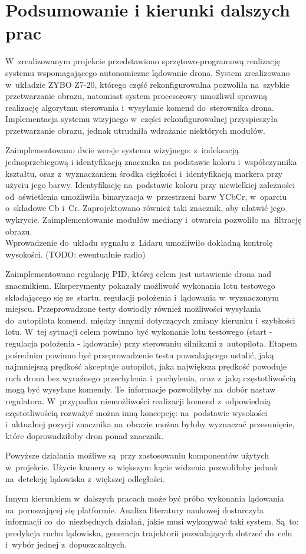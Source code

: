 \chapter{Podsumowanie i kierunki dalszych prac}
\label{cha:Podsumowanie i kierunki dalszych prac}
W~zrealizowanym projekcie przedstawiono sprzętowo-programową realizację systemu wspomagającego autonomiczne lądowanie drona. System zrealizowano w~układzie ZYBO Z7-20, którego część rekonfigurowalna pozwoliła na~szybkie przetwarzanie obrazu, natomiast system procesorowy umożliwił sprawną realizację algorytmu sterowania i~wysyłanie komend do~sterownika drona. Implementacja systemu wizyjnego w~części rekonfigurowalnej przyspieszyła przetwarzanie obrazu, jednak utrudniła wdrażanie niektórych modułów.\par
Zaimplementowano dwie wersje systemu wizyjnego: z~indeksacją jednoprzebiegową i identyfikacją znacznika na podstawie koloru i~współczynnika kształtu, oraz z~wyznaczaniem środka ciężkości i~identyfikacją markera przy użyciu jego barwy. Identyfikację na~podstawie koloru przy niewielkiej zależności od~oświetlenia umożliwiła binaryzacja w~przestrzeni barw YCbCr, w~oparciu o~składowe Cb i~Cr. Zaprojektowano również taki znacznik, aby ułatwić jego wykrycie. Zaimplementowanie modułów mediany i~otwarcia pozwoliło na~filtrację obrazu.\\
Wprowadzenie do~układu sygnału z~Lidaru umożliwiło dokładną kontrolę wysokości. (TODO: ewentualnie radio)\par
Zaimplementowano regulację PID, której celem jest ustawienie drona nad znacznikiem. Eksperymenty pokazały możliwość wykonania lotu testowego składającego się ze~startu, regulacji położenia i~lądowania w~wyznaczonym miejscu.
Przeprowadzone testy dowiodły również możliwości wysyłania do~autopilota komend, między innymi dotyczących zmiany kierunku i~szybkości lotu. 
W~tej sytuacji celem powinno być wykonanie lotu testowego (start - regulacja położenia - lądowanie) przy sterowaniu silnikami z~autopilota. Etapem pośrednim powinno być przeprowadzenie testu pozwalającego ustalić, jaką najmniejszą prędkość akceptuje autopilot, jaka największa prędkość powoduje ruch drona bez wyraźnego przechylenia i~pochylenia, oraz z~jaką częstotliwością mogą być wysyłane komendy. Te~informacje pozwoliłyby na~dobór nastaw regulatora. W~przypadku niemożliwości realizacji komend z~odpowiednią częstotliwością rozważyć można inną koncepcję: na~podstawie wysokości i~aktualnej pozycji znacznika na~obrazie można byłoby wyznaczać przesunięcie, które doprowadziłoby dron ponad znacznik.\par
Powyższe działania możliwe są~przy zastosowaniu komponentów użytych w~projekcie. Użycie kamery o~większym kącie widzenia pozwoliłoby jednak na~detekcję lądowiska z~większej odległości.\par
Innym kierunkiem w~dalszych pracach może być próba wykonania lądowania na~poruszającej się platformie. Analiza literatury naukowej dostarczyła informacji co~do~niezbędnych działań, jakie musi wykonywać taki system. Są~to: predykcja ruchu lądowiska, generacja trajektorii pozwalających dotrzeć do~celu i~wybór jednej z~dopuszczalnych.


